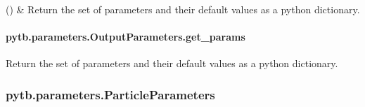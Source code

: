 \documentclass[letterpaper,10pt,english,openany,oneside]{sphinxmanual}
\begin{document}
\begin{fulllineitems}
\begin{savenotes}\sphinxattablestart
\sphinxthistablewithglobalstyle
\sphinxthistablewithnovlinesstyle
\centering
\begin{tabulary}{\linewidth}[t]{}
\sphinxtoprule
\sphinxtableatstartofbodyhook
\sphinxAtStartPar
{\hyperref[\detokenize{api/pytb.parameters.OutputParameters.get_params:pytb.parameters.OutputParameters.get_params}]{}}()
&
\sphinxAtStartPar
Return the set of parameters and their default values as a python dictionary.
\\
\sphinxbottomrule
\end{tabulary}
\sphinxtableafterendhook\par
\sphinxattableend\end{savenotes}

\sphinxstepscope


\paragraph{pytb.parameters.OutputParameters.get\_params}
\label{\detokenize{api/pytb.parameters.OutputParameters.get_params:pytb-parameters-outputparameters-get-params}}\label{\detokenize{api/pytb.parameters.OutputParameters.get_params::doc}}

\begin{fulllineitems}
\label{\detokenize{api/pytb.parameters.OutputParameters.get_params:pytb.parameters.OutputParameters.get_params}}
\pysigstartsignatures
{}
\pysigstopsignatures
\sphinxAtStartPar
Return the set of parameters and their default values
as a python dictionary.

\end{fulllineitems}


\end{fulllineitems}


\sphinxstepscope


\subsubsection{pytb.parameters.ParticleParameters}
\label{\detokenize{api/pytb.parameters.ParticleParameters:pytb-parameters-particleparameters}}\label{\detokenize{api/pytb.parameters.ParticleParameters::doc}}
\end{document}
